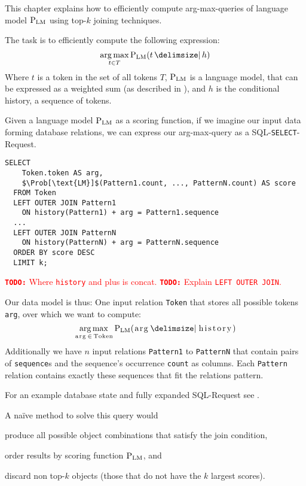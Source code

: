 \documentclass[m,bachelor,binding]{WeSTthesis}
\renewcommand\cref{\Cref}
\DeclareMathOperator*{\Argmax}{arg\,max}
\newcommand{\inlinecode}[1]{\lstinline[columns=fixed]{#1}}
\newcommand{\todo}[1]{\textcolor{red}{{\footnotesize\textbf{\texttt{TODO:}}} #1}}
\begin{document}
This chapter explains how to efficiently compute arg-max-queries of language
model $\Prob[\text{LM}]$ using top-$k$ joining techniques.

The task is to efficiently compute the following expression:
\begin{equation}
  \Argmax_{t \in T} \Prob[\text{LM}]{t}{h}
\end{equation}
Where $t$ is a token in the set of all tokens $T$, $\Prob[\text{LM}]$ is a
language model, that can be expressed as a weighted sum (as described in
\cref{ch:weightedsum}), and $h$ is the conditional history, a sequence
of tokens.

Given a language model $\Prob[\text{LM}]$ as a scoring function, if we
imagine our input data forming database relations, we can express our
arg-max-query as a SQL-\texttt{SELECT}-Request.

\begin{lstlisting}[mathescape]
  SELECT
    Token.token AS arg,
    $\Prob[\text{LM}]$(Pattern1.count, ..., PatternN.count) AS score
  FROM Token
  LEFT OUTER JOIN Pattern1
    ON history(Pattern1) + arg = Pattern1.sequence
  ...
  LEFT OUTER JOIN PatternN
    ON history(PatternN) + arg = PatternN.sequence
  ORDER BY score DESC
  LIMIT k;
\end{lstlisting}

\todo{Where \inlinecode{history} and plus is concat.}
\todo{Explain \inlinecode{LEFT OUTER JOIN}.}

Our data model is thus: One input relation \inlinecode{Token} that stores
all possible tokens \inlinecode{arg}, over which we want to compute:
\begin{equation}
  \Argmax_{\text{\inlinecode{arg}} \, \in \, \text{\inlinecode{Token}}}
    \Prob[\text{LM}]{\text{\inlinecode{arg}}}{\text{\inlinecode{history}}}
\end{equation}
Additionally we have $n$ input relations
\inlinecode{Pattern1} to \inlinecode{PatternN} that contain pairs
of \inlinecode{sequence}s and the sequence's occurrence \inlinecode{count} as
columns.
Each \inlinecode{Pattern} relation contains exactly these sequences that fit the
relations pattern.

For an example database state and fully expanded SQL-Request see
\cref{app:sql-example}.

A naïve method to solve this query would
\begin{inparaenum}[(1)]
  \item produce all possible object combinations that satisfy the join
    condition,
  \item order results by scoring function $\Prob[\text{LM}]$, and
  \item discard non top-$k$ objects (those that do not have the $k$ largest
    scores).
\end{inparaenum}
\end{document}
